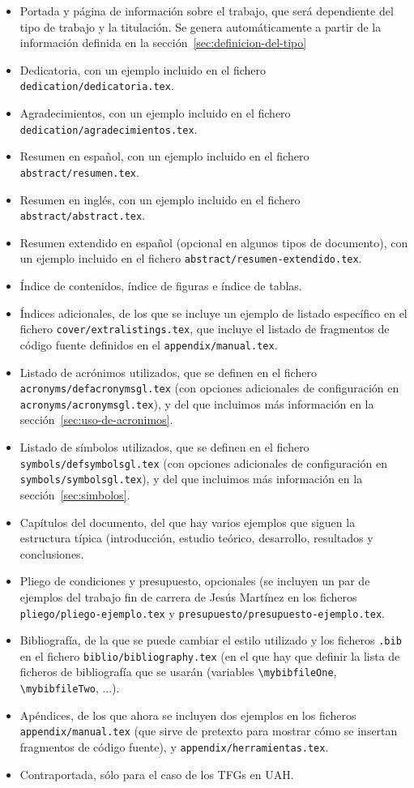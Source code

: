 \begin{itemize}
\item Portada y página de información sobre el trabajo, que será
  dependiente del tipo de trabajo y la titulación. Se genera
  automáticamente a partir de la información definida en la
  sección~\ref{sec:definicion-del-tipo}
\item Dedicatoria, con un ejemplo incluido en el fichero
  \texttt{dedication/dedicatoria.tex}.
\item Agradecimientos, con un ejemplo incluido en el fichero
  \texttt{dedication/agradecimientos.tex}.
\item Resumen en español, con un ejemplo incluido en el fichero
  \texttt{abstract/resumen.tex}.
\item Resumen en inglés, con un ejemplo incluido en el fichero
  \texttt{abstract/abstract.tex}.
\item Resumen extendido en español (opcional en algunos tipos de
  documento), con un ejemplo incluido en el fichero
  \texttt{abstract/resumen-extendido.tex}.
\item Índice de contenidos, índice de figuras e índice de tablas.
\item Índices adicionales, de los que se incluye un ejemplo de listado
  específico en el fichero \texttt{cover/extralistings.tex}, que incluye
  el listado de fragmentos de código fuente definidos en el
  \texttt{appendix/manual.tex}.
\item Listado de acrónimos utilizados, que se definen en el fichero
  \texttt{acronyms/defacronymsgl.tex} (con opciones adicionales de
  configuración en \texttt{acronyms/acronymsgl.tex}), y del que
  incluimos más información en la sección~\ref{sec:uso-de-acronimos}.
\item Listado de símbolos utilizados, que se definen en el fichero
  \texttt{symbols/defsymbolsgl.tex} (con opciones adicionales de
  configuración en \texttt{symbols/symbolsgl.tex}), y del que incluimos
  más información en la sección~\ref{sec:simbolos}.
\item Capítulos del documento, del que hay varios ejemplos que siguen la
  estructura típica (introducción, estudio teórico, desarrollo,
  resultados y conclusiones.
\item Pliego de condiciones y presupuesto, opcionales (se incluyen un
  par de ejemplos del trabajo fin de carrera de Jesús Martínez en los
  ficheros \texttt{pliego/pliego-ejemplo.tex} y
  \texttt{presupuesto/presupuesto-ejemplo.tex}.
\item Bibliografía, de la que se puede cambiar el estilo utilizado y los
  ficheros \texttt{.bib} en el fichero
  \texttt{biblio/bibliography.tex} (en el que hay que definir la lista
  de ficheros de bibliografía que se usarán (variables
  \texttt{\textbackslash{}mybibfileOne},
  \texttt{\textbackslash{}mybibfileTwo}, ...).
\item Apéndices, de los que ahora se incluyen dos ejemplos en los
  ficheros \texttt{appendix/manual.tex} (que sirve de pretexto para
  mostrar cómo se insertan fragmentos de código fuente), y
  \texttt{appendix/herramientas.tex}.
\item Contraportada, sólo para el caso de los TFGs en UAH.
\end{itemize}

